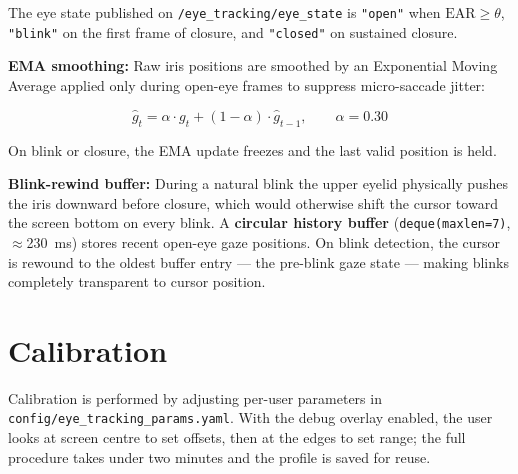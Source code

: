 The eye state published on \texttt{/eye\_tracking/eye\_state} is \texttt{"open"} when
$\text{EAR} \geq \theta$, \texttt{"blink"} on the first frame of closure, and
\texttt{"closed"} on sustained closure.

\textbf{EMA smoothing:} Raw iris positions are smoothed by an Exponential Moving Average
applied only during open-eye frames to suppress micro-saccade jitter:

\begin{equation}
    \hat{g}_t = \alpha \cdot g_t + (1 - \alpha)\cdot\hat{g}_{t-1}, \qquad \alpha = 0.30
    \label{eq:ema}
\end{equation}

On blink or closure, the EMA update freezes and the last valid position is held.

\textbf{Blink-rewind buffer:} During a natural blink the upper eyelid physically pushes
the iris downward before closure, which would otherwise shift the cursor toward the screen
bottom on every blink. A \textbf{circular history buffer}
(\texttt{deque(maxlen=7)}, $\approx$230~ms) stores recent open-eye gaze positions.
On blink detection, the cursor is rewound to the oldest buffer entry — the pre-blink gaze
state — making blinks completely transparent to cursor position.

\section{Calibration}

Calibration is performed by adjusting per-user parameters in \newline
\texttt{config/eye\_tracking\_params.yaml}. With the debug overlay enabled, the user
looks at screen centre to set offsets, then at the edges to set range; the full procedure
takes under two minutes and the profile is saved for reuse.

